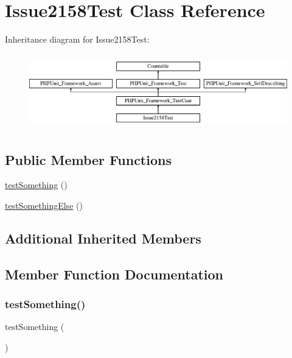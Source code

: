\hypertarget{class_issue2158_test}{}\section{Issue2158\+Test Class Reference}
\label{class_issue2158_test}
Inheritance diagram for Issue2158\+Test\+:\begin{figure}[H]
\begin{center}
\leavevmode
\includegraphics[height=3.303835cm]{class_issue2158_test}
\end{center}
\end{figure}
\subsection*{Public Member Functions}
\begin{DoxyCompactItemize}
\item 
\mbox{\hyperlink{class_issue2158_test_a0fc4e17369bc9607ebdd850d9eda8167}{test\+Something}} ()
\item 
\mbox{\hyperlink{class_issue2158_test_abcb919247213405c5d20880827d2972d}{test\+Something\+Else}} ()
\end{DoxyCompactItemize}
\subsection*{Additional Inherited Members}


\subsection{Member Function Documentation}
\mbox{\label{class_issue2158_test_a0fc4e17369bc9607ebdd850d9eda8167}} 
\subsubsection{\texorpdfstring{test\+Something()}{testSomething()}}
{\footnotesize\ttfamily test\+Something (\begin{DoxyParamCaption}{ }\end{DoxyParamCaption})}

